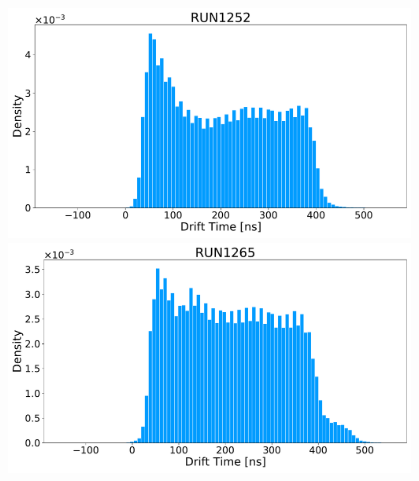 \documentclass{beamer}
\begin{document}
\begin{frame}
{\begin{columns}
\begin{column}{0.5\textwidth}
					\begin{figure}
						\centering 
						\includegraphics[width=1.0\textwidth]{./Images/reference_blue.pdf}
						\includegraphics[width=1.0\textwidth]{./Images/1265_blue.pdf}
					\end{figure}

			\end{column}


			\begin{column}{0.5\textwidth}


\end{column}
\end{columns}}
\end{frame}
\end{document}
